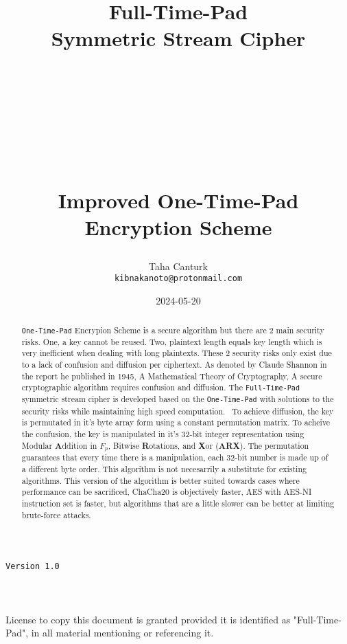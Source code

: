 \documentclass[fleqn, a4paper,12pt]{article}
\title {
	\Huge \textbf{Full-Time-Pad\\Symmetric Stream Cipher} \\
	\ \\
	\ \\
	\ \\
	\ \\
	\ \\
	\Large \textbf{Improved One-Time-Pad Encryption Scheme}

}
\author{Taha Canturk\\\texttt{kibnakanoto@protonmail.com}}
\date{2024-05-20}
\begin{document}
\maketitle
\thispagestyle{empty}


\begin{center}
		\Large \texttt{Version 1.0}
		\ \\
		\ \\
		\ \\
		\ \\
		\small License to copy this document is granted provided it is identified as "Full-Time-Pad", in all material mentioning or referencing it.
\end{center}

\newpage


\begin{abstract}
		\fontsize{12}{18}\selectfont \texttt{One-Time-Pad} Encrypion Scheme is a secure algorithm but there are 2 main security risks. One, a key cannot be reused. Two, plaintext length equals key length which is very inefficient when dealing with long plaintexts. These 2 security risks only exist due to a lack of confusion and diffusion per ciphertext. As denoted by Claude Shannon in the report he published in 1945, A Mathematical Theory of Cryptography, A secure cryptographic algorithm requires confusion and diffusion. The \texttt{Full-Time-Pad} symmetric stream cipher is developed based on the \texttt{One-Time-Pad} with solutions to the security risks while maintaining high speed computation. \
		To achieve diffusion, the key is permutated in it's byte array form using a constant permutation matrix. To acheive the confusion, the key is manipulated in it's 32-bit integer representation using Modular \textbf{A}ddition in $F_p$, Bitwise \textbf{R}otations, and \textbf{X}or (\textbf{ARX}). The permutation guarantees that every time there is a manipulation, each 32-bit number is made up of a different byte order. This algorithm is not necesarrily a substitute for existing algorithms. This version of the algorithm is better suited towards cases where performance can be sacrificed, ChaCha20 is objectively faster, AES with AES-NI instruction set is faster, but algorithms that are a little slower can be better at limiting brute-force attacks.

		

\end{abstract}
\end{document}
